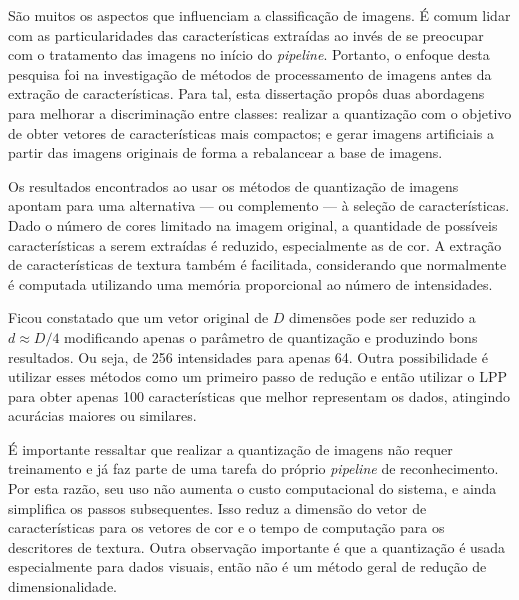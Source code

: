
São muitos os aspectos que influenciam a classificação de imagens. É comum lidar com as particularidades das características extraídas ao invés de se preocupar com o tratamento das imagens no início do \textit{pipeline}. Portanto, o enfoque desta pesquisa foi na investigação de métodos de processamento de imagens antes da extração de características. Para tal, esta dissertação propôs duas abordagens para melhorar a discriminação entre classes: realizar a quantização com o objetivo de obter vetores de características mais compactos; e gerar imagens artificiais a partir das imagens originais de forma a rebalancear a base de imagens.

Os resultados encontrados ao usar os métodos de quantização de imagens apontam para uma alternativa --- ou complemento --- à seleção de características. Dado o número de cores limitado na imagem original, a quantidade de possíveis características a serem extraídas é reduzido, especialmente as de cor. A extração de características de textura também é facilitada, considerando que normalmente é computada utilizando uma memória proporcional ao número de intensidades.

Ficou constatado que um vetor original de $D$ dimensões pode ser reduzido a $d \approx D/4$ modificando apenas o parâmetro de quantização e produzindo bons resultados. Ou seja, de 256 intensidades para apenas 64. Outra possibilidade é utilizar esses métodos como um primeiro passo de redução e então utilizar o LPP para obter apenas 100 características que melhor representam os dados, atingindo acurácias maiores ou similares.

É importante ressaltar que realizar a quantização de imagens não requer treinamento e já faz parte de uma tarefa do próprio \textit{pipeline} de reconhecimento. Por esta razão, seu uso não aumenta o custo computacional do sistema, e ainda simplifica os passos subsequentes. Isso reduz a dimensão do vetor de características para os vetores de cor e o tempo de computação para os descritores de textura. Outra observação importante é que a quantização é usada especialmente para dados visuais, então não é um método geral de redução de dimensionalidade.

